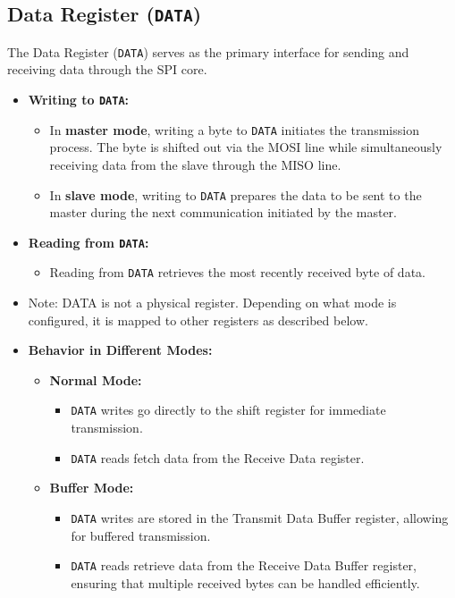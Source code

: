   \subsection{Data Register (\texttt{DATA})}
  \label{sec:data_register}
  The Data Register (\texttt{DATA}) serves as the primary interface for sending and receiving data through the SPI core.
  
  \begin{itemize}
      \item \textbf{Writing to \texttt{DATA}:}
      \begin{itemize}
          \item In \textbf{master mode}, writing a byte to \texttt{DATA} initiates the transmission process. The byte is shifted out via the MOSI line while simultaneously receiving data from the slave through the MISO line.
          \item In \textbf{slave mode}, writing to \texttt{DATA} prepares the data to be sent to the master during the next communication initiated by the master.
      \end{itemize}
      
      \item \textbf{Reading from \texttt{DATA}:}
      \begin{itemize}
          \item Reading from \texttt{DATA} retrieves the most recently received byte of data.
      \end{itemize}
      
      \item Note: DATA is not a physical register. Depending on what mode is configured, it is mapped to other registers as described below.

      \item \textbf{Behavior in Different Modes:}
      \begin{itemize}
          \item \textbf{Normal Mode:}
          \begin{itemize}
              \item \texttt{DATA} writes go directly to the shift register for immediate transmission.
              \item \texttt{DATA} reads fetch data from the Receive Data register.
          \end{itemize}
          \item \textbf{Buffer Mode:}
          \begin{itemize}
              \item \texttt{DATA} writes are stored in the Transmit Data Buffer register, allowing for buffered transmission.
              \item \texttt{DATA} reads retrieve data from the Receive Data Buffer register, ensuring that multiple received bytes can be handled efficiently.
          \end{itemize}
      \end{itemize}
  \end{itemize}
  
